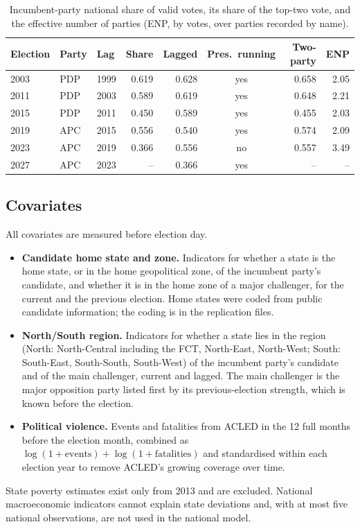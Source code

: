 \documentclass[preprint,12pt,authoryear]{elsarticle}
\begin{document}
\begin{table}[ht]
\centering
\caption{Incumbent-party national share of valid votes, its share of the top-two vote, and the effective number of parties (ENP, by votes, over parties recorded by name).}
\label{tab:national}
\small
\setlength{\tabcolsep}{4pt}
\begin{tabular}{lllrrcrr}
\toprule
Election & Party & Lag & Share & Lagged & Pres.\ running & Two-party & ENP \\
\midrule
2003 & PDP & 1999 & 0.619 & 0.628 & yes & 0.658 & 2.05 \\
2011 & PDP & 2003 & 0.589 & 0.619 & yes & 0.648 & 2.21 \\
2015 & PDP & 2011 & 0.450 & 0.589 & yes & 0.455 & 2.03 \\
2019 & APC & 2015 & 0.556 & 0.540 & yes & 0.574 & 2.09 \\
2023 & APC & 2019 & 0.366 & 0.556 & no & 0.557 & 3.49 \\
2027 & APC & 2023 & -- & 0.366 & yes & -- & -- \\
\bottomrule
\end{tabular}
\end{table}

\subsection{Covariates}
All covariates are measured before election day.
\begin{itemize}
\item \textbf{Candidate home state and zone.} Indicators for whether a state is the home state, or in the home geopolitical zone, of the incumbent party's candidate, and whether it is in the home zone of a major challenger, for the current and the previous election. Home states were coded from public candidate information; the coding is in the replication files.
\item \textbf{North/South region.} Indicators for whether a state lies in the region (North: North-Central including the FCT, North-East, North-West; South: South-East, South-South, South-West) of the incumbent party's candidate and of the main challenger, current and lagged. The main challenger is the major opposition party listed first by its previous-election strength, which is known before the election.
\item \textbf{Political violence.} Events and fatalities from ACLED \citep{Raleigh2010IntroducingAcled, ACLEDHDX} in the 12 full months before the election month, combined as $\log(1+\text{events})+\log(1+\text{fatalities})$ and standardised within each election year to remove ACLED's growing coverage over time.
\end{itemize}
State poverty estimates \citep{OPHIMPI} exist only from 2013 and are excluded. National macroeconomic indicators cannot explain state deviations and, with at most five national observations, are not used in the national model.
\end{document}

